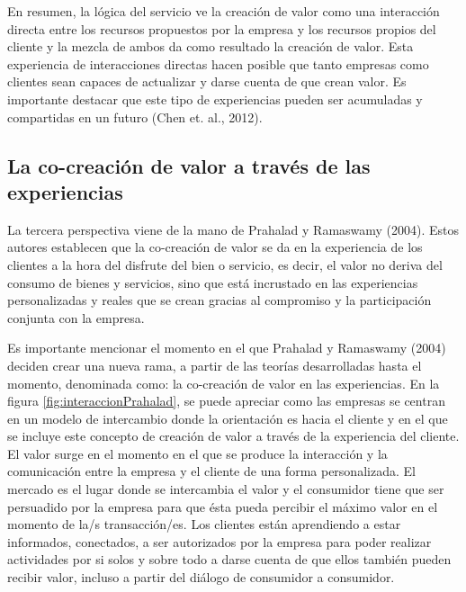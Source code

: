 En resumen, la lógica del servicio ve la creación de valor como una interacción directa entre los recursos propuestos por la empresa y los recursos propios del cliente y la mezcla de ambos da como resultado la creación de valor. Esta experiencia de interacciones directas hacen posible que tanto empresas como clientes sean capaces de actualizar y darse cuenta de que crean valor. Es importante destacar que este tipo de experiencias pueden ser acumuladas y compartidas en un futuro (Chen et. al., 2012).

\subsection{La co-creación de valor a través de las experiencias}

La tercera perspectiva viene de la mano de Prahalad y Ramaswamy (2004). Estos autores establecen que la co-creación de valor se da en la experiencia de los clientes a la hora del disfrute del bien o servicio, es decir, el valor no deriva del consumo de bienes y servicios, sino que está incrustado en las experiencias personalizadas y reales que se crean gracias al compromiso y la participación conjunta con la empresa. 

Es importante mencionar el momento en el que Prahalad y Ramaswamy (2004) deciden crear una nueva rama, a partir de las teorías desarrolladas hasta el momento, denominada como: la co-creación de valor en las experiencias. En la figura \ref{fig:interaccionPrahalad}, se puede apreciar como las empresas se centran en un modelo de intercambio donde la orientación es hacia el cliente y en el que se incluye este concepto de creación de valor a través de la experiencia del cliente. El valor surge en el momento en el que se produce la interacción y la comunicación entre la empresa y el cliente de una forma personalizada. El mercado es el lugar donde se intercambia el valor y el consumidor tiene que ser persuadido por la empresa para que ésta pueda percibir el máximo valor en el momento de la/s transacción/es. Los clientes están aprendiendo a estar informados, conectados, a ser autorizados por la empresa para poder realizar actividades por si solos y sobre todo a darse cuenta de que ellos también pueden recibir valor, incluso a partir del diálogo de consumidor a consumidor.

